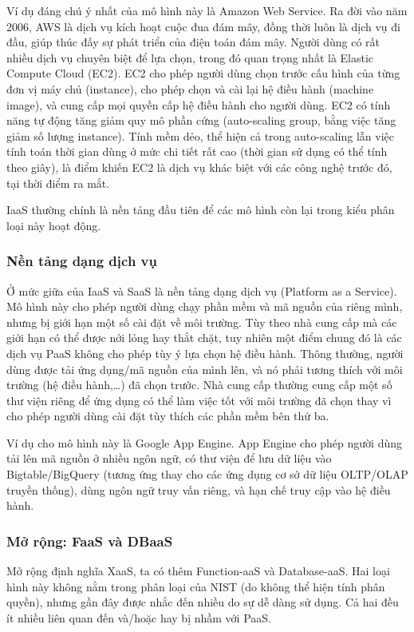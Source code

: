 \documentclass{article}
\begin{document}
Ví dụ đáng chú ý nhất của mô hình này là Amazon Web Service. Ra đời vào năm
2006, AWS là dịch vụ kích hoạt cuộc đua đám mây, đồng thời luôn là dịch vụ đi
đầu, giúp thúc đấy sự phát triển của điện toán đám mây. Người dùng có rất nhiều
dịch vụ chuyên biệt để lựa chọn, trong đó quan trọng nhất là Elastic Compute
Cloud (EC2). EC2 cho phép người dùng chọn trước cấu hình của từng đơn vị máy chủ
(instance), cho phép chọn và cài lại hệ điều hành (machine image), và cung cấp
mọi quyền cấp hệ điều hành cho người dùng. EC2 có tính năng tự động tăng giảm
quy mô phần cứng (auto-scaling group, bằng việc tăng giảm số lượng instance).
Tính mềm dẻo, thể hiện cả trong auto-scaling lẫn việc tính toán thời gian dùng ở
mức chi tiết rất cao (thời gian sử dụng có thể tính theo giây), là điểm khiến
EC2 là dịch vụ khác biệt với các công nghệ trước đó, tại thời điểm ra mắt.

IaaS thường chính là nền tảng đầu tiên để các mô hình còn lại trong kiểu phân
loại này hoạt động.

\subsubsection{Nền tảng dạng dịch vụ}

Ở mức giữa của IaaS và SaaS là nền tảng dạng dịch vụ (Platform as a Service). Mô
hình này cho phép người dùng chạy phần mềm và mã nguồn của riêng mình, nhưng bị
giới hạn một số cài đặt về môi trường. Tùy theo nhà cung cấp mà các giới hạn có
thể được nới lỏng hay thắt chặt, tuy nhiên một điểm chung đó là các dịch vụ PaaS
không cho phép tùy ý lựa chọn hệ điều hành. Thông thường, người dùng được tải
ứng dụng/mã nguồn của mình lên, và nó phải tương thích với môi trường (hệ điều
hành,\ldots) đã chọn trước. Nhà cung cấp thường cung cấp một số thư viện riêng
để ứng dụng có thể làm việc tốt với môi trường đã chọn thay vì cho phép người
dùng cài đặt tùy thích các phần mềm bên thứ ba.

Ví dụ cho mô hình này là Google App Engine. App Engine cho phép người dùng tải
lên mã nguồn ở nhiều ngôn ngữ, có thư viện để lưu dữ liệu vào Bigtable/BigQuery
(tương ứng thay cho các ứng dụng cơ sở dữ liệu OLTP/OLAP truyền thống), dùng
ngôn ngữ truy vấn riêng, và hạn chế truy cập vào hệ điều hành.

\subsubsection{Mở rộng: FaaS và DBaaS}

Mở rộng định nghĩa XaaS, ta có thêm Function-aaS và Database-aaS. Hai loại hình
này không nằm trong phân loại của NIST (do không thể hiện tính phân quyền),
nhưng gần đây được nhắc đến nhiều do sự dễ dàng sử dụng. Cả hai đều ít nhiều
liên quan đến và/hoặc hay bị nhầm với PaaS.
\end{document}
